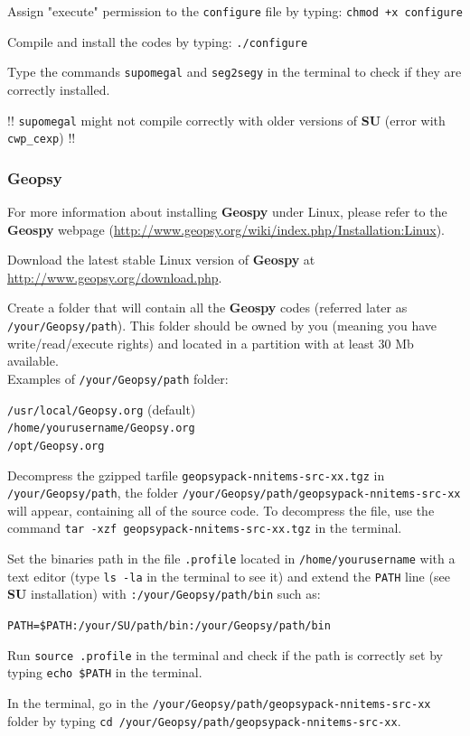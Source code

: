 \documentclass[twoside,a4paper]{article}
\def\SU{\textbf{SU}}
\def\Geopsy{\textbf{Geospy}}
\begin{document}
Assign "execute" permission to the \verb|configure| file by typing: \verb|chmod +x configure|

Compile and install the codes by typing: \verb|./configure|

Type the commands \verb|supomegal| and \verb|seg2segy| in the terminal to check if they are correctly installed.

!! \verb|supomegal| might not compile correctly with older versions of {\SU} (error with \verb|cwp_cexp|) !!

\subsubsection{Geopsy}
For more information about installing {\Geopsy} under Linux, please refer to the {\Geopsy} webpage (\url{http://www.geopsy.org/wiki/index.php/Installation:Linux}).

Download the latest stable Linux version of {\Geopsy} at \url{http://www.geopsy.org/download.php}.

Create a folder that will contain all the {\Geopsy} codes (referred later as \verb|/your/Geopsy/path|). This folder should be owned by you (meaning you have write/read/execute rights) and located in a partition with at least 30 Mb available.\\[1ex]
Examples of \verb|/your/Geopsy/path| folder:

\verb|/usr/local/Geopsy.org| (default)\\
\verb|/home/yourusername/Geopsy.org|\\
\verb|/opt/Geopsy.org|

Decompress the gzipped tarfile \verb|geopsypack-nnitems-src-xx.tgz| in \verb|/your/Geopsy/path|, the folder \verb|/your/Geopsy/path/geopsypack-nnitems-src-xx| will appear, containing all of the source code. To decompress the file, use the command \verb|tar -xzf geopsypack-nnitems-src-xx.tgz| in the terminal.

Set the binaries path in the file \verb|.profile| located in \verb|/home/yourusername| with a text editor (type \verb|ls -la| in the terminal to see it) and extend the \verb|PATH| line (see {\SU} installation) with \verb|:/your/Geopsy/path/bin| such as:

\verb|PATH=$PATH:/your/SU/path/bin:/your/Geopsy/path/bin|

Run \verb|source .profile| in the terminal and check if the path is correctly set by typing \verb|echo $PATH| in the terminal.

In the terminal, go in the \verb|/your/Geopsy/path/geopsypack-nnitems-src-xx| folder by typing \verb|cd /your/Geopsy/path/geopsypack-nnitems-src-xx|.
\end{document}
